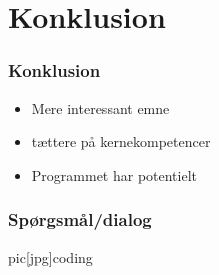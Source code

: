 \documentclass[xcolor={dvipsnames}]{beamer}
\begin{document}
\section{Konklusion}

\begin{frame}
\frametitle{Konklusion}
\begin{itemize}
\item Mere interessant emne 
\item tættere på kernekompetencer
\item Programmet har potentielt
\end{itemize}
\end{frame}

\begin{frame}
\frametitle{Spørgsmål/dialog}
pic[jpg]{coding}
\end{frame}

\end{document}

